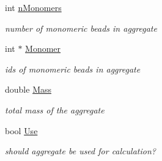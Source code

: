 \begin{DoxyCompactItemize}
\mbox{\label{structAggregate_a7f4c8376295eb0f7dbf9538de5795487}} 
int \hyperlink{structAggregate_a7f4c8376295eb0f7dbf9538de5795487}{n\+Monomers}
\begin{DoxyCompactList}\small\item\em number of monomeric beads in aggregate \end{DoxyCompactList}\item 
\mbox{\label{structAggregate_aac1f701037be2781a85f8130bff0c698}} 
int $\ast$ \hyperlink{structAggregate_aac1f701037be2781a85f8130bff0c698}{Monomer}
\begin{DoxyCompactList}\small\item\em ids of monomeric beads in aggregate \end{DoxyCompactList}\item 
\mbox{\label{structAggregate_ae4e31d1958041aeb6f1651a4489c24f9}} 
double \hyperlink{structAggregate_ae4e31d1958041aeb6f1651a4489c24f9}{Mass}
\begin{DoxyCompactList}\small\item\em total mass of the aggregate \end{DoxyCompactList}\item 
\mbox{\label{structAggregate_a053e007b04a98a23f4b69084e1534df5}} 
bool \hyperlink{structAggregate_a053e007b04a98a23f4b69084e1534df5}{Use}
\begin{DoxyCompactList}\small\item\em should aggregate be used for calculation? \end{DoxyCompactList}\end{DoxyCompactItemize}
